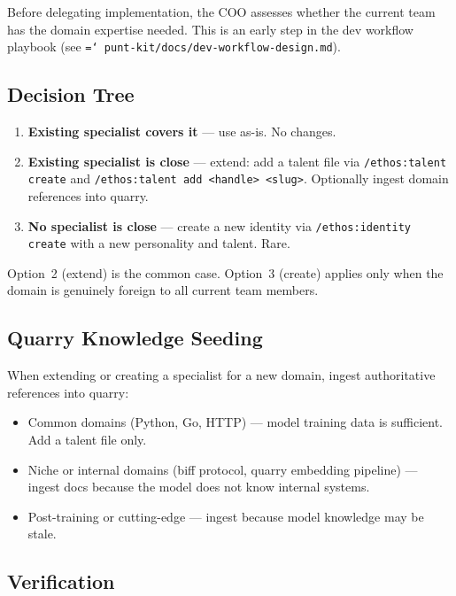 \documentclass[a4paper,10pt]{article}
\newcommand{\fpath}[1]{\texttt{\hyphenchar\font=`\/ #1}}
\newcommand{\cmd}[1]{\texttt{#1}}
\begin{document}
Before delegating implementation, the COO assesses whether the
current team has the domain expertise needed. This is an early step
in the dev workflow playbook (see
\fpath{punt-kit/docs/dev-workflow-design.md}).

\subsection{Decision Tree}

\begin{enumerate}
  \item \textbf{Existing specialist covers it} ---
    use as-is. No changes.
  \item \textbf{Existing specialist is close} ---
    extend: add a talent file via \cmd{/ethos:talent create} and
    \cmd{/ethos:talent add <handle> <slug>}. Optionally ingest
    domain references into quarry.
  \item \textbf{No specialist is close} ---
    create a new identity via \cmd{/ethos:identity create} with
    a new personality and talent. Rare.
\end{enumerate}

Option~2 (extend) is the common case. Option~3 (create) applies
only when the domain is genuinely foreign to all current team
members.

\subsection{Quarry Knowledge Seeding}

When extending or creating a specialist for a new domain, ingest
authoritative references into quarry:

\begin{itemize}
  \item Common domains (Python, Go, HTTP) --- model training data is
    sufficient. Add a talent file only.
  \item Niche or internal domains (biff protocol, quarry embedding
    pipeline) --- ingest docs because the model does not know
    internal systems.
  \item Post-training or cutting-edge --- ingest because model
    knowledge may be stale.
\end{itemize}

\subsection{Verification}
\end{document}
